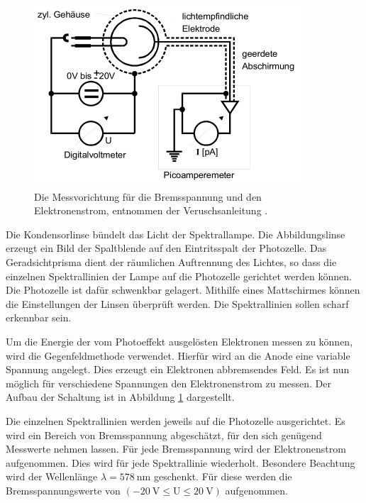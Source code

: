  \begin{figure}
    \centering
    \includegraphics[width=0.7\linewidth]{images/Messung.png}
    \caption{Die Messvorichtung für die Bremsspannung und den Elektronenstrom, entnommen der Veruschsanleitung \cite[76]{sample}.}
    \label{fig:Messung}
  \end{figure}

Die Kondensorlinse bündelt das Licht der Spektrallampe.
Die Abbildungslinse erzeugt ein Bild der Spaltblende auf den Eintritsspalt der Photozelle.
Das Geradsichtprisma dient der räumlichen Auftrennung des Lichtes, so dass die einzelnen Spektrallinien der Lampe auf die Photozelle gerichtet werden können.
Die Photozelle ist dafür schwenkbar gelagert.
Mithilfe eines Mattschirmes können die Einstellungen der Linsen überprüft werden.
Die Spektrallinien sollen scharf erkennbar sein.

Um die Energie der vom Photoeffekt ausgelösten Elektronen messen zu können, wird die Gegenfeldmethode verwendet.
Hierfür wird an die Anode eine variable Spannung angelegt.
Dies erzeugt ein Elektronen abbremsendes Feld.
Es ist nun möglich für verschiedene Spannungen den Elektronenstrom zu messen.
Der Aufbau der Schaltung ist in Abbildung \ref{fig:Messung} dargestellt.

Die einzelnen Spektrallinien werden jeweils auf die Photozelle ausgerichtet.
Es wird ein Bereich von Bremsspannung abgeschätzt, für den sich genügend Messwerte nehmen lassen.
Für jede Bremsspannung wird der Elektronenstrom aufgenommen.
Dies wird für jede Spektrallinie wiederholt.
Besondere Beachtung wird der Wellenlänge $\lambda = \SI{578}{\nano\metre}$ geschenkt.
Für diese werden die Bremsspannungswerte von $ (\SI{-20}{\volt} \leq \text{U} \leq \SI{+20}{\volt})$ aufgenommen.
